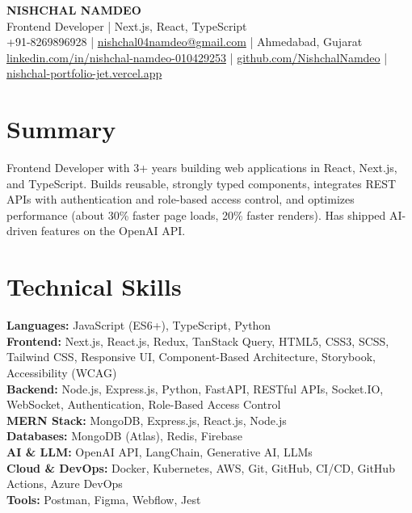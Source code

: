 \documentclass[a4paper,10pt]{article}
\begin{document}
\begin{center}
  {\LARGE \textbf{NISHCHAL NAMDEO}}\\[3pt]
  Frontend Developer | Next.js, React, TypeScript\\[3pt]
  +91-8269896928 | \href{mailto:nishchal04namdeo@gmail.com}{nishchal04namdeo@gmail.com} | Ahmedabad, Gujarat\\[2pt]
  \href{https://www.linkedin.com/in/nishchal-namdeo-010429253/}{linkedin.com/in/nishchal-namdeo-010429253} |
  \href{https://github.com/NishchalNamdeo}{github.com/NishchalNamdeo} |
  \href{https://nishchal-portfolio-jet.vercel.app/}{nishchal-portfolio-jet.vercel.app}
\end{center}

\section{Summary}
Frontend Developer with 3+ years building web applications in React, Next.js, and TypeScript. Builds reusable, strongly typed components, integrates REST APIs with authentication and role-based access control, and optimizes performance (about 30\% faster page loads, 20\% faster renders). Has shipped AI-driven features on the OpenAI API.

\section{Technical Skills}
\textbf{Languages:} JavaScript (ES6+), TypeScript, Python\\
\textbf{Frontend:} Next.js, React.js, Redux, TanStack Query, HTML5, CSS3, SCSS, Tailwind CSS, Responsive UI, Component-Based Architecture, Storybook, Accessibility (WCAG)\\
\textbf{Backend:} Node.js, Express.js, Python, FastAPI, RESTful APIs, Socket.IO, WebSocket, Authentication, Role-Based Access Control\\
\textbf{MERN Stack:} MongoDB, Express.js, React.js, Node.js\\
\textbf{Databases:} MongoDB (Atlas), Redis, Firebase\\
\textbf{AI \& LLM:} OpenAI API, LangChain, Generative AI, LLMs\\
\textbf{Cloud \& DevOps:} Docker, Kubernetes, AWS, Git, GitHub, CI/CD, GitHub Actions, Azure DevOps\\
\textbf{Tools:} Postman, Figma, Webflow, Jest
\end{document}
